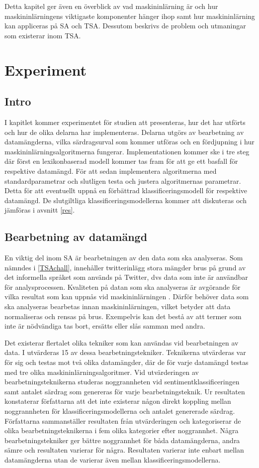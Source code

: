 \documentclass{kaumasters} %
\begin{document}
Detta kapitel ger även en överblick av vad maskininlärning är och hur maskininlärningens viktigaste komponenter hänger ihop samt hur maskininlärning kan appliceras på SA och TSA. Dessutom beskrivs de problem och utmaningar som existerar inom TSA. 

\chapter{Experiment}
\section{Intro}
I kapitlet kommer experimentet för studien att presenteras, hur det har utförts och hur de olika delarna har implementeras. Delarna utgörs av bearbetning av datamängderna, vilka särdragsurval som kommer utföras och en fördjupning i hur maskininlärningsalgoritmerna fungerar. Implementationen kommer ske i tre steg där först en lexikonbaserad modell kommer tas fram för att ge ett basfall för respektive datamängd. För att sedan implementera algoritmerna med standardparametrar och slutligen testa och justera algoritmernas parametrar. Detta för att eventuellt uppnå en förbättrad klassificeringsmodell för respektive datamängd. 
De slutgiltliga klassificeringsmodellerna kommer att diskuteras och jämföras i avsnitt \ref{res}.
\section{Bearbetning av datamängd} \label{exp:pre}
En viktig del inom SA är bearbetningen av den data som ska analyseras. Som nämndes i \ref{TSAchall}, innehåller twitterinlägg stora mängder brus på grund av det informella språket som används på Twitter, dvs data som inte är användbar för analysprocessen. Kvaliteten på datan som ska analyseras är avgörande för vilka resultat som kan uppnås vid maskininlärningen \cite{effrosynidis2017comparison}. Därför behöver data som ska analyseras bearbetas innan maskininlärningen, vilket betyder att data normaliseras och rensas på brus. Exempelvis kan det bestå av att termer som inte är nödvändiga tas bort, ersätts eller slås samman med andra. 

Det existerar flertalet olika tekniker som kan användas vid bearbetningen av data.  I \cite{effrosynidis2017comparison} utvärderas 15 av dessa bearbetningstekniker. Teknikerna utvärderas var för sig och testas mot två olika datamängder, där de för varje datamängd testas med tre olika maskininlärningsalgoritmer. Vid utvärderingen av bearbetningsteknikerna studeras noggrannheten vid sentimentklassificeringen samt antalet särdrag som genereras för varje bearbetningsteknik. Ur resultaten konstaterar författarna att det inte existerar någon direkt koppling mellan noggrannheten för klassificeringsmodellerna och antalet genererade särdrag. Författarna sammanställer resultaten från utvärderingen och kategoriserar de olika bearbetningsteknikerna i fem olika kategorier efter noggrannhet. Några bearbetningstekniker ger bättre noggrannhet för båda datamängderna, andra sämre och resultaten varierar för några. Resultaten varierar inte enbart mellan datamängderna utan de varierar även mellan klassificeringsmodellerna. 
\end{document}
